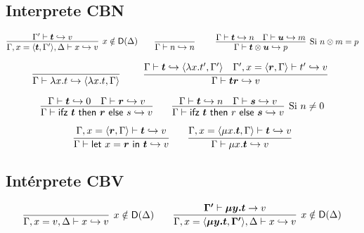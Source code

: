 \documentclass[twoside,a4paper,12pt]{article}
\theoremstyle{definition}
\theoremstyle{remark}
\begin{document}
\newpage

\subsection*{Interprete CBN}

\begin{equation*}
  \infer[x\notin\mathsf D(\Delta)]
    {\Gamma,x=\thunk {\bm{t}}{\Gamma'},\Delta\vdash x\hra v}
    {\Gamma'\vdash \bm{t}\hra v}
  \qquad
  \infer[]
    {\Gamma\vdash n\hra n}
    {}
  \qquad
  \infer[\textrm{Si }n\otimes m=p]
    {\Gamma\vdash \bm{t} \otimes \bm{u} \hra p}
    {\Gamma\vdash \bm{t} \hra n & \Gamma\vdash \bm{u}\hra m }
\end{equation*}

\begin{equation*}
  \infer[]
    {\Gamma\vdash\fun xt\hra\thunk {\fun xt}\Gamma}
    {}
  \qquad
  \infer[]
    {\Gamma\vdash \bm{t} \bm{r} \hra v}
    {
      \Gamma\vdash \bm{t} \hra \thunk{\fun x{t'}}{\Gamma'}
      & \Gamma',x=\thunk{\bm{r}}{\Gamma} \vdash t'\hra v
    }
\end{equation*}

\begin{equation*}
  \infer
    {\Gamma\vdash \ifz {\bm t}{\bm r}{s} \hra v}
    {\Gamma\vdash \bm t \hra 0 & \Gamma \vdash \bm r \hra v}
  \qquad
  \infer[\textrm{Si }n\neq 0]
    {\Gamma\vdash \ifz {\bm t}{r}{\bm s} \hra v}
    {\Gamma\vdash \bm t \hra n & \Gamma\vdash \bm s \hra v}
\end{equation*}

\begin{equation*}
  \infer
    {\Gamma \vdash \letl {x}{\bm r}{\bm t} \hra v}
    {\Gamma,x=\thunk{\bm r}{\Gamma} \vdash \bm t \hra v}
  \qquad
    \infer{\Gamma\vdash\fix{x}{\bm t} \hra v}
    {\Gamma,x=\thunk{\fix{x}{\bm t}}\Gamma\vdash \bm t \hra v}
\end{equation*}

\subsection*{Intérprete CBV}

\begin{equation*}
  \infer[x\notin\mathsf D(\Delta)]
    {\Gamma,x=v,\Delta\vdash x\hra v}
    {}
  \qquad
  \infer[x\notin\mathsf D(\Delta)]
    {\Gamma,x=\thunk{\bm{\fix yt}}{\bm{\Gamma'}},\Delta\vdash x\hra v}
    {\bm{\Gamma'} \vdash \bm{\fix yt} \to v}
\end{equation*}
\end{document}
